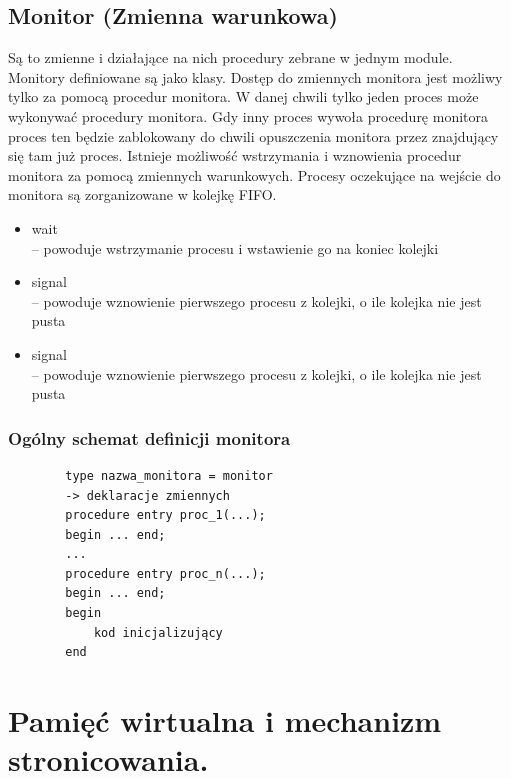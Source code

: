 \documentclass[12pt]{article}
\begin{document}
   \subsection{Monitor (Zmienna warunkowa)}
    Są to zmienne i działające na nich procedury zebrane w jednym module. Monitory definiowane są jako klasy. Dostęp do zmiennych monitora jest możliwy tylko za pomocą procedur monitora. W danej chwili tylko jeden proces może wykonywać procedury monitora. Gdy inny proces wywoła procedurę monitora proces ten będzie zablokowany do chwili opuszczenia monitora przez znajdujący się tam już proces. Istnieje możliwość wstrzymania i wznowienia procedur monitora za pomocą zmiennych warunkowych. Procesy oczekujące na wejście do monitora są zorganizowane w kolejkę FIFO.
    
    \begin{itemize}
        \item wait\\ – powoduje wstrzymanie procesu i wstawienie go na koniec kolejki
        \item signal\\ – powoduje wznowienie pierwszego procesu z kolejki, o ile kolejka nie jest pusta
        \item signal\\ – powoduje wznowienie pierwszego procesu z kolejki, o ile kolejka nie jest pusta
    \end{itemize}
    
    \subsubsection{Ogólny schemat definicji monitora}
    \begin{verbatim}
        type nazwa_monitora = monitor
        -> deklaracje zmiennych
        procedure entry proc_1(...);
        begin ... end;
        ...
        procedure entry proc_n(...);
        begin ... end;
        begin
            kod inicjalizujący
        end
    \end{verbatim}

\newpage

    \section{Pamięć wirtualna i mechanizm stronicowania.}
    
\end{document}
